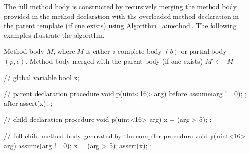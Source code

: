 The full method body is constructed by recursively merging the method 
body provided in the method declaration with the overloaded method 
declaration in the parent template (if one exists) using 
Algorithm~\ref{a:method}.  The following examples illustrate the algorithm.


\begin{algorithm}
    \begin{algorithmic}[1]
         Method body $M$, where $M$ is 
        either a complete body $(b)$ or partial body $(p,e)$.
         Method body merged with the parent body (if one exists)
          \State $M' \gets$ 
             $M$
          \EndIf
            \EndCase
            \EndCase
            \EndCase
            \EndCase
          \EndSwitch 
        \EndFunction
    \end{algorithmic}
    \caption{}\label{a:method}
\end{algorithm}

\begin{tsllisting2}
// global variable
bool x;

// parent declaration
procedure void p(uint<16> arg)
before{ 
    assume(arg != 0);
};
after{
    assert(x);
};

// child declaration
procedure void p(uint<16> arg)
{
    x = (arg > 5);
};

// full child method body generated by the compiler
procedure void p(uint<16> arg)
{
    assume(arg != 0);
    x = (arg > 5);
    assert(x);
};
\end{tsllisting2}

